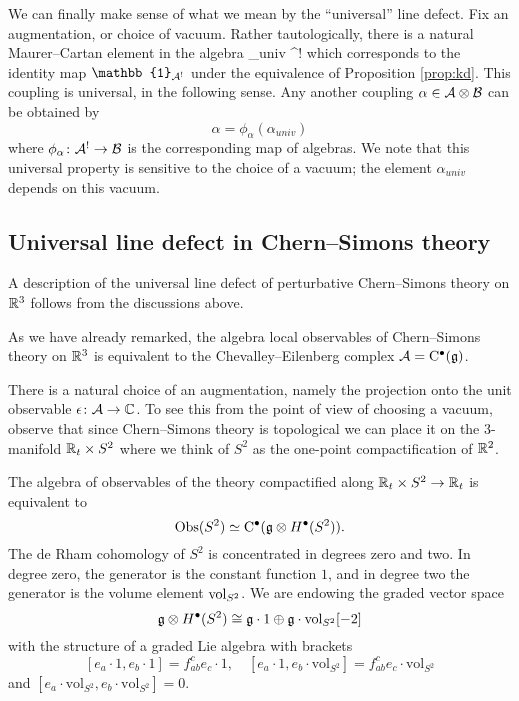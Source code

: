 \documentclass[11pt]{amsart}
\def\id{\mathbb{1}}
\begin{document}
We can finally make sense of what we mean by the ``universal'' line defect. 
Fix an augmentation, or choice of vacuum. 
Rather tautologically, there is a natural Maurer--Cartan element in the algebra 
\beqn\label{eqn:univ}
\alpha_{univ} \in \cA \otimes \cA^! 
\eeqn
which corresponds to the identity map $\id_{\cA^!}$ under the equivalence of Proposition \ref{prop:kd}. 
This coupling is universal, in the following sense. 
Any another coupling $\alpha \in \mathcal A \otimes \mathcal B$ can be obtained by
\[
\alpha = \phi_\alpha (\alpha_{univ})
\]
where $\phi_\alpha \colon \mathcal A^! \to \mathcal B$ is the corresponding map of algebras. 
We note that this universal property is sensitive to the choice of a vacuum; the element $\alpha_{univ}$ depends on this vacuum.  

\subsection{Universal line defect in Chern--Simons theory} 

A description of the universal line defect of perturbative Chern--Simons theory on $\mathbb R^3$ follows from the discussions above. 

As we have already remarked, the algebra local observables of Chern--Simons theory on $\mathbb R^3$ is equivalent to the Chevalley--Eilenberg complex $\mathcal A = {\rm C}^\bullet(\mathfrak g)$. 

There is a natural choice of an augmentation, namely the projection onto the unit observable $\epsilon\colon \mathcal A \to \mathbb C$. 
To see this from the point of view of choosing a vacuum, observe that since Chern--Simons theory is topological we can place it on the $3$-manifold $\mathbb R_t \times S^2$ where we think of $S^2$ as the one-point compactification of $\mathbb R^2$. 

The algebra of observables of the theory compactified along $\mathbb R_t \times S^2 \to \mathbb R_t$ is equivalent to 
\[
{\rm Obs} (S^2) \simeq {\rm C}^\bullet (\mathfrak g \otimes H^\bullet(S^2)) .
\] 
The de Rham cohomology of $S^2$ is concentrated in degrees zero and two.  
In degree zero, the generator is the constant function $1$, and in degree two the generator is the volume element ${\rm vol}_{S^2}$. 
We are endowing the graded vector space
\[
\mathfrak g \otimes H^\bullet (S^2) \cong \mathfrak g \cdot 1 \oplus \mathfrak g \cdot \text{vol}_{S^2} [-2]
\]
with the structure of a graded Lie algebra with brackets 
\[
[e_a \cdot 1, e_b \cdot 1] = f_{ab}^c e_c \cdot 1, \quad [e_a \cdot 1, e_b \cdot \text{vol}_{S^2}] = f_{ab}^c e_c \cdot \text{vol}_{S^2}
\]  
and $[e_a \cdot \text{vol}_{S^2}, e_b \cdot \text{vol}_{S^2}] = 0$. 
\end{document}
